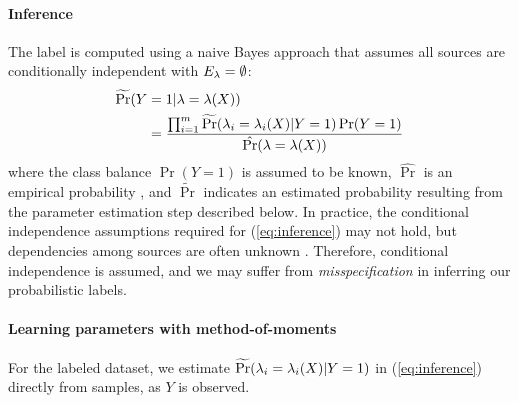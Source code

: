 \paragraph{Inference} The label is computed using a naive Bayes approach that assumes all sources are conditionally independent with $E_{\lambda} = \emptyset$:
\begin{align}
    \widetilde{\Pr}(Y &= 1 | \lambda = \lambda(X)) \nonumber \\
    &= \frac{\prod_{i = 1}^m \widetilde{\Pr}(\lambda_i = \lambda_i(X) | Y = 1) \Pr(Y = 1)}{\hat{\Pr}(\lambda = \lambda(X))} 
    \label{eq:inference}
\end{align}
where the class balance $\Pr(Y = 1)$ is assumed to be known, $\hat{\Pr}$ is an empirical probability
, and $\widetilde{\Pr}$ indicates an estimated probability resulting from the parameter estimation step described below. %
%
In practice, the conditional independence assumptions required for (\ref{eq:inference}) may not hold, but dependencies among sources are often unknown%
. Therefore, conditional independence is assumed, and we may suffer from \emph{misspecification} in inferring our probabilistic labels. %


\paragraph{Learning parameters with method-of-moments}
For the labeled dataset, we estimate $\widetilde{\Pr}(\lambda_i = \lambda_i(X) | Y = 1)$ in (\ref{eq:inference}) directly from samples, as $Y$ is observed. 

